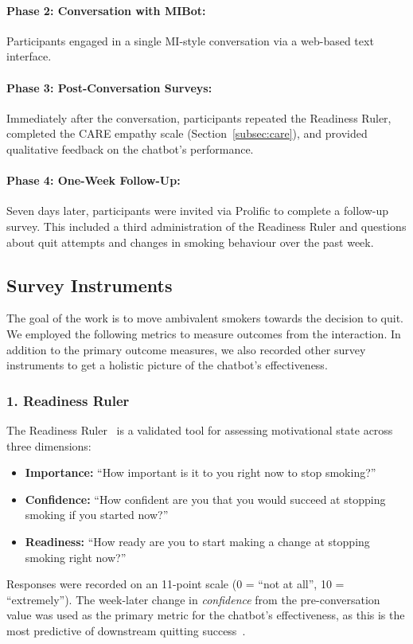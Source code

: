 \paragraph{Phase 2: Conversation with MIBot:}
Participants engaged in a single MI-style conversation via a web-based text interface.

\paragraph{Phase 3: Post-Conversation Surveys:}
Immediately after the conversation, participants repeated the Readiness Ruler, completed the CARE empathy scale (Section~\ref{subsec:care}), and provided qualitative feedback on the chatbot's performance.

\paragraph{Phase 4: One-Week Follow-Up:}
Seven days later, participants were invited via Prolific to complete a follow-up survey. This included a third administration of the Readiness Ruler and questions about quit attempts and changes in smoking behaviour over the past week.

\subsection{Survey Instruments}
\label{subsec:survey-instruments}

The goal of the work is to move ambivalent smokers towards the decision to quit. We employed the following metrics to measure outcomes from the interaction. In addition to the primary outcome measures, we also recorded other survey instruments to get a holistic picture of the chatbot's effectiveness.

\subsubsection{1. Readiness Ruler}
\label{subsec:readiness-ruler}
The Readiness Ruler~\citep{rollnick1992development} is a validated tool for assessing motivational state across three dimensions:
\begin{itemize}
    \item \textbf{Importance:} ``How important is it to you right now to stop smoking?''
    \item \textbf{Confidence:} ``How confident are you that you would succeed at stopping smoking if you started now?''
    \item \textbf{Readiness:} ``How ready are you to start making a change at stopping smoking right now?''
\end{itemize}
Responses were recorded on an 11-point scale (0 = ``not at all'', 10 = ``extremely''). The week-later change in \emph{confidence} from the pre-conversation value was used as the primary metric for the chatbot's effectiveness, as this is the most predictive
of downstream quitting success~\cite{Gwaltney2009-wj,Abar2013}.

